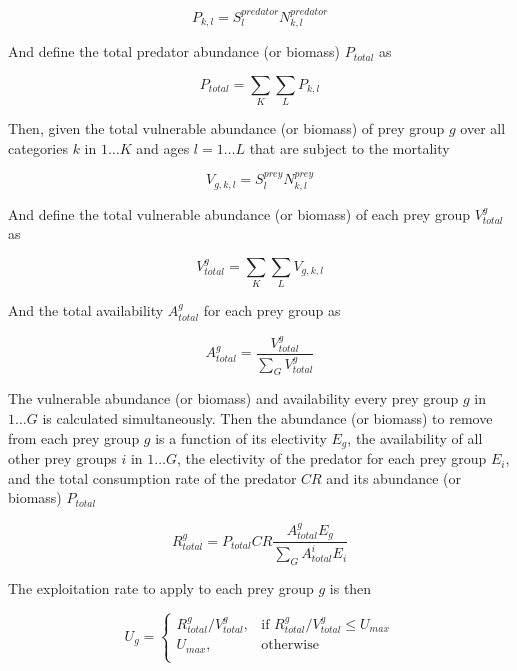 \begin{equation}
P_{k,l} = S^{predator}_l N^{predator}_{k,l}
\end{equation}

And define the total predator abundance (or biomass) $P_{total}$ as

\begin{equation}
P_{total}  = \sum\limits_K {\sum\limits_L {P_{k,l}}}
\end{equation}

Then, given the total vulnerable abundance (or biomass) of prey group $g$ over all categories $k$ in $1 \ldots K$ and ages $l = 1 \ldots L$ that are subject to the mortality

\begin{equation}
V_{g,k,l} = S^{prey}_l N^{prey}_{k,l}
\end{equation}

And define the total vulnerable abundance (or biomass) of each prey group $V^g_{total}$ as

\begin{equation}
V^g_{total}  = \sum\limits_K {\sum\limits_L {V_{g,k,l}}}
\end{equation}

And the total availability $A^g_{total}$ for each prey group as

\begin{equation}
A^g_{total} = \frac{V^g_{total}}{\sum\limits_G {V^g_{total}}}
\end{equation}

The vulnerable abundance (or biomass) and availability every prey group $g$ in $1 \ldots G$ is calculated simultaneously. Then the abundance (or biomass) to remove from each prey group $g$ is a function of its electivity $E_g$, the availability of all other prey groups $i$ in $1 \ldots G$, the electivity of the predator for each prey group $E_i$, and the total consumption rate of the predator $CR$ and its abundance (or biomass) $P_{total}$

\begin{equation}
R^g_{total}=P_{total} CR \frac{A^g_{total} E_g}{\sum\limits_G {A^i_{total} E_i}}
\end{equation}

The exploitation rate to apply to each prey group $g$ is then

\begin{equation}
U_g = \begin{cases}
R^g_{total}/V^g_{total}, & \text{if $R^g_{total}/V^g_{total} \leq U_{max}$} \\
U_{max}, & \text{otherwise}\\
\end{cases}
\end{equation}


